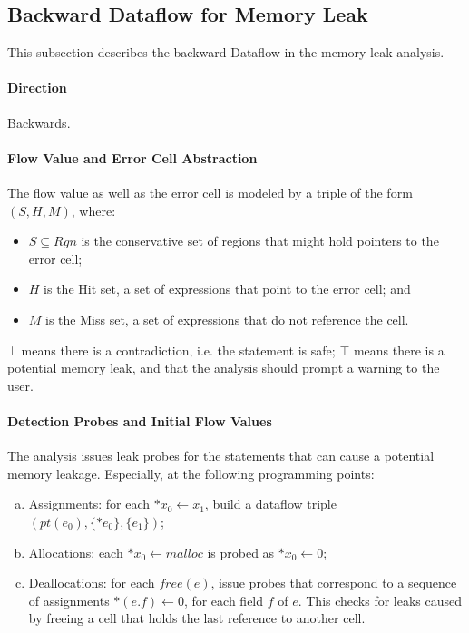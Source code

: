 \subsection{Backward Dataflow for Memory Leak}
\label{ss:dataflow}

This subsection describes the backward Dataflow in the memory leak analysis. 

\paragraph{Direction}

Backwards.

\paragraph{Flow Value and Error Cell Abstraction}

The flow value as well as the error cell is modeled by a triple of the form 
$(S,H,M)$, where:

\begin{itemize}
  \item $S\subseteq Rgn$ is the conservative set of regions that might hold 
    pointers to the error cell;
  \item $H$ is the Hit set, a set of expressions that point to the error cell; and 
  \item $M$ is the Miss set, a set of expressions that do not reference the cell.
\end{itemize}

$\bot$ means there is a contradiction, i.e. the statement is safe; 
$\top$ means there is a potential memory leak, and that the analysis should 
prompt a warning to the user.

\paragraph{Detection Probes and Initial Flow Values}

The analysis issues leak probes for the statements that can cause a potential 
memory leakage. Especially, at the following programming points:

\begin{enumerate}[(a)]
  \item Assignments: for each $*x_0\gets x_1$, build a dataflow triple 
    $(pt(e_0),\{*e_0\},\{e_1\})$;
  \item Allocations: each $*x_0\gets malloc$ is probed as $*x_0\gets 0$;
  \item Deallocations: for each $free(e)$, issue probes that correspond to a 
    sequence of assignments $*(e.f)\gets 0$, for each field $f$ of $e$. This 
    checks for leaks caused by freeing a cell that holds the last reference 
    to another cell.
\end{enumerate}


